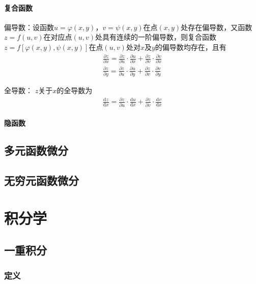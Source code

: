 \documentclass[12pt]{book}
\begin{document}
\subsubsection{复合函数}

偏导数：设函数$ u=\varphi(x,y) $，$ v=\psi (x,y) $在点$ (x,y) $处存在偏导数，又函数$ z=f(u,v) $在对应点$ (u,v) $处具有连续的一阶偏导数，则复合函数$ z=f[\varphi(x,y),\psi(x,y)] $在点$ (u,v) $处对$ x $及$ y $的偏导数均存在，且有
\begin{gather*}
    \frac{\partial z}{\partial x}=\frac{\partial z}{\partial u}\cdot \frac{\partial u}{\partial x}+\frac{\partial z}{\partial v}\cdot \frac{\partial v}{\partial x}\\
    \frac{\partial z}{\partial y}=\frac{\partial z}{\partial u}\cdot \frac{\partial u}{\partial y }+\frac{\partial z}{\partial v}\cdot \frac{\partial v}{\partial y} 
\end{gather*}
 

全导数： $z $关于$ x $的全导数为
\begin{gather*}
    \frac{\mathrm{d}z}{\mathrm{d}x} = \frac{\partial z}{\partial u}\cdot\frac{\mathrm{d}u}{\mathrm{d}x}+ \frac{\partial z}{\partial v}\cdot\frac{\mathrm{d}v}{\mathrm{d}x} 
\end{gather*}
 

\subsubsection{隐函数}



\section{多元函数微分}


\section{无穷元函数微分}




\chapter{积分学}




\section{一重积分}


\subsection{定义}
\end{document}
